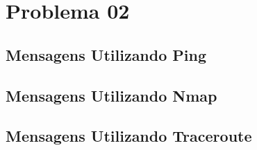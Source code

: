 \chapter[Problema 02]{Problema 02}

\section{Mensagens Utilizando Ping}
\section{Mensagens Utilizando Nmap}
\section{Mensagens Utilizando Traceroute}
